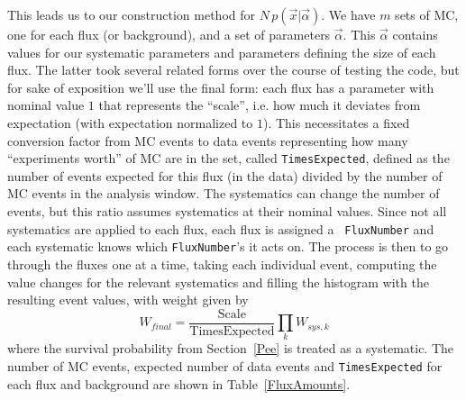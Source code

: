 This leads us to our construction method for $N \,
p(\vec{x}|\vec{\alpha})$.  We have $m$ sets of MC, one for each flux
(or background), and a set of parameters $\vec{\alpha}$.  This
$\vec{\alpha}$ contains values for our systematic parameters and
parameters defining the size of each flux.  The latter took several
related forms over the course of testing the code, but for sake of
exposition we'll use the final form: each flux has a parameter with
nominal value $1$ that represents the ``scale'', i.e. how much it
deviates from expectation (with expectation normalized to $1$).  This
necessitates a fixed conversion factor from MC events to data events
representing how many ``experiments worth'' of MC are in the set,
called {\tt TimesExpected}, defined as the number of events expected
for this flux (in the data) divided by the number of MC events in the
analysis window.  The systematics can change the number of events, but
this ratio assumes systematics at their nominal values.  Since not all
systematics are applied to each flux, each flux is assigned a {\tt
FluxNumber} and each systematic knows which {\tt FluxNumber}'s it acts
on.  The process is then to go through the fluxes one at a time,
taking each individual event, computing the value changes for the
relevant systematics and filling the histogram with the resulting
event values, with weight given by
\begin{equation}
\label{FinalWeight}
W_{final} = \frac{\mathrm{Scale}}{\mathrm{TimesExpected}} \prod_k W_{sys,k}
\end{equation}
where the survival probability from \mbox{Section \ref{Pee}} is
treated as a systematic.  The number of MC events, expected number of
data events and {\tt TimesExpected} for each flux and background are
shown in \mbox{Table \ref{FluxAmounts}}.

